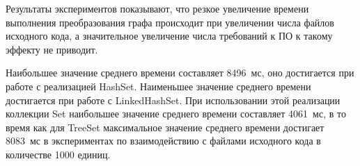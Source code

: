 Результаты экспериментов показывают, что резкое увеличение времени выполнения преобразования графа происходит при увеличении числа файлов исходного кода, а значительное увеличение числа требований к ПО к такому эффекту не приводит.

Наибольшее значение среднего времени составляет 8496~мс, оно достигается при работе с реализацией HashSet. Наименьшее значение среднего времени достигается при работе с LinkedHashSet. При использовании этой реализации коллекции Set наибольшее значение среднего времени составляет 4061~мс, в то время как для TreeSet максимальное значение среднего времени достигает 8083~мс в экспериментах по взаимодействию с файлами исходного кода в количестве 1000 единиц.